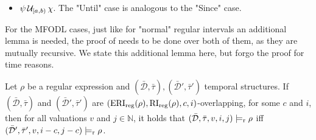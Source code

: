 \begin{itemize}
        The second possibility for $(\bar{\mathcal{D}}, \bar{\tau}, v, i) not\models \psi \Since{[a,b)} \chi$ is, that for all $j \leq i$ with $\tau_i - \tau_j \in [a,b)$ and $(\bar{\mathcal{D}}, \bar{\tau}, v, j) \models \chi$ there is some $k \in \mathbb{N}$ with $j < k \leq i$, $(\bar{\mathcal{D}}, \bar{\tau}, v, k) \not\models \psi$.
        It follows from this that for every $j' \in \mathbb{N}$ with $j' \leq i-c$, $\tau'_{i-c} - \tau'_{j'} \in [a,b)$, and $(\bar{\mathcal{D}}', \bar{\tau}', v, j') \models \chi$, there exists a $j \in \mathbb{N}$ with $j = j' + c$.
        It follows from $\tau'_{i-c} - \tau'_{j'} \in [a,b)$ and $\tau'_{i-c} = \tau_i$, that $\tau'_{j'} - \tau_i \in (-b,-a]$ and further with the help of Definition \ref{def:rel-int} it follows that $\tau'_{j'} - \tau_i \in \RI(\psi \Since{[a,b)} \chi)$.
        From this we recall Condition 2 from Definition \ref{def:overlapping-ext} and see that $\tau_j = \tau'_{j-c} = \tau'{j'}$.
        Since $j' \leq i-c$ and $j = j'+c$ it follows that $j \leq i$.
        By having shown that $\tau'_{j'} = \tau_j$ and $j \leq i$, we can now make use of Claim (i) from above again and combine it with $(\bar{\mathcal{D}}, \bar{\tau}, v, j) \models \chi$.
        It follows that $(\bar{\mathcal{D}}', \bar{\tau}', v, j'+c) \models \chi$.
        From $\tau'_{j'} = \tau_{j+c} = \tau_j$ it follows that $\tau_k = \tau'_{k-c}$
        Going back around we now have that there is a $k \in \mathbb{N}$ with $ j' < k-c \leq i-c$, for which $(\bar{\mathcal{D}}', \bar{\tau}', v, k-c) \not\models \chi$.
        




        \dots


    \item
        $\psi \,\mathcal{U}_{[a,b)}\, \chi$.
        The "Until" case is analogous to the "Since" case.
\end{itemize}


For the MFODL cases, just like for "normal" regular intervals an additional lemma is needed, the proof of needs to be done over both of them, as they are mutually recursive.
We state this additional lemma here, but forgo the proof for time reasons.

\begin{lemma}
    \label{lem:eri-completness-reg}
    Let $\rho$ be a regular expression and $(\bar{\mathcal{D}}, \bar{\tau}), (\bar{\mathcal{D}}', \bar{\tau}')$ temporal structures.
    If $(\bar{\mathcal{D}}, \bar{\tau})$ and $(\bar{\mathcal{D}}', \bar{\tau}')$ are $(\operatorname{ERI}_{\text{reg}}(\rho),\operatorname{RI}_{\text{reg}}(\rho),c,i)$-overlapping, for some $c$ and $i$, then for all valuations $v$ and $j \in \mathbb{N}$, it holds that $(\bar{\mathcal{D}}, \bar{\tau},v,i,j) \models_{\text{r}} \rho$ iff $(\bar{\mathcal{D}}',\bar{\tau}',v,i-c,j-c) \models_{\text{r}} \rho$.
\end{lemma}